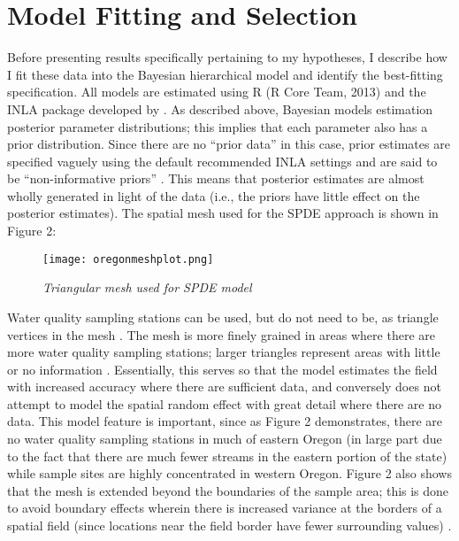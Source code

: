 \documentclass[11pt,a4paper,titlepage]{article}
\begin{document}
\section*{Model Fitting and Selection}

Before presenting results specifically pertaining to my hypotheses, I describe how I fit these data into the Bayesian hierarchical model and identify the best-fitting specification. All models are estimated using R (R Core Team, 2013) and the INLA package developed by \textcite{rue2009}. As described above, Bayesian models estimation posterior parameter distributions; this implies that each parameter also has a prior distribution. Since there are no “prior data” in this case, prior estimates are specified vaguely using the default recommended INLA settings \parencite{rue2009} and are said to be “non-informative priors” \parencite{gelman2013}. This means that posterior estimates are almost wholly generated in light of the data (i.e., the priors have little effect on the posterior estimates). The spatial mesh used for the SPDE approach is shown in Figure 2: 

\begin{figure}[!htbp]
\graphicspath{ {`/Users/TScott/Google\space Drive/quinalt/APPAM_2014/'}}
\texttt{[image: oregonmeshplot.png]}
\label{fig:mesh}
\noindent
\caption{\textit{Triangular mesh used for SPDE model}}
\end{figure}

Water quality sampling stations can be used, but do not need to be, as triangle vertices in the mesh \parencite{lindgren2011}. The mesh is more finely grained in areas where there are more water quality sampling stations; larger triangles represent areas with little or no information \parencite{cosandey-godin2014}. Essentially, this serves so that the model estimates the field with increased accuracy where there are sufficient data, and conversely does not attempt to model the spatial random effect with great detail where there are no data. This model feature is important, since as Figure 2 demonstrates, there are no water quality sampling stations in much of eastern Oregon (in large part due to the fact that there are much fewer streams in the eastern portion of the state) while sample sites are highly concentrated in western Oregon. Figure 2 also shows that the mesh is extended beyond the boundaries of the sample area; this is done to avoid boundary effects wherein there is increased variance at the borders of a spatial field (since locations near the field border have fewer surrounding values) \parencite{lindgren2013}.
\end{document}
